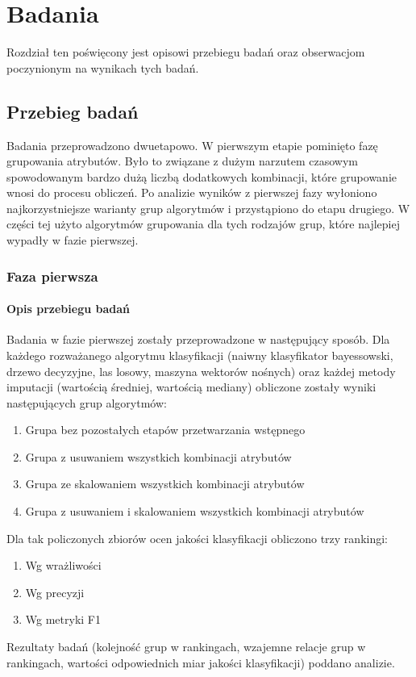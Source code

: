\documentclass[../thesis.tex]{subfiles}
\begin{document}
\pagestyle{plain}
\chapter{Badania}

Rozdział ten poświęcony jest opisowi przebiegu badań oraz obserwacjom poczynionym na wynikach tych badań. 

\section{Przebieg badań}

Badania przeprowadzono dwuetapowo. W pierwszym etapie pominięto fazę grupowania atrybutów. Było to związane z dużym narzutem czasowym spowodowanym bardzo dużą liczbą dodatkowych kombinacji, które grupowanie wnosi do procesu obliczeń. Po analizie wyników z pierwszej fazy wyłoniono najkorzystniejsze warianty grup algorytmów i przystąpiono do etapu drugiego. W części tej użyto algorytmów grupowania dla tych rodzajów grup, które najlepiej wypadły w fazie pierwszej.

\subsection{Faza pierwsza}

\subsubsection{Opis przebiegu badań}

Badania w fazie pierwszej zostały przeprowadzone w następujący sposób. Dla każdego rozważanego algorytmu klasyfikacji (naiwny klasyfikator bayessowski, drzewo decyzyjne, las losowy, maszyna wektorów nośnych) oraz każdej metody imputacji (wartością średniej, wartością mediany) obliczone zostały wyniki następujących grup algorytmów:

\begin{enumerate}
  \item Grupa bez pozostałych etapów przetwarzania wstępnego
  \item Grupa z usuwaniem wszystkich kombinacji atrybutów
  \item Grupa ze skalowaniem wszystkich kombinacji atrybutów
  \item Grupa z usuwaniem i skalowaniem wszystkich kombinacji atrybutów
\end{enumerate}
Dla tak policzonych zbiorów ocen jakości klasyfikacji obliczono trzy rankingi:
\begin{enumerate}
  \item Wg wrażliwości
  \item Wg precyzji
  \item Wg metryki F1
\end{enumerate}
Rezultaty badań (kolejność grup w rankingach, wzajemne relacje grup w rankingach, wartości odpowiednich miar jakości klasyfikacji) poddano analizie.
\end{document}
